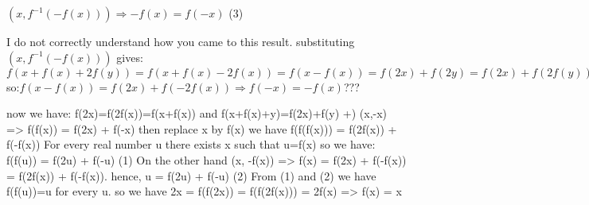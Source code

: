 \begin{solution}
	\begin{tcolorbox}$(x , f^{-1} (-f(x))) \Rightarrow -f(x)=f(-x)$ (3)\end{tcolorbox}

I do not correctly understand how you came to this result.
substituting $(x , f^{-1}(-f(x)))$ gives:
$f(x+f(x)+2f(y))=f(x+f(x)-2f(x))=f(x-f(x))=f(2x)+f(2y)=f(2x)+f(2f(y))=f(2x)+f(-2f(x))$ 
so:$f(x-f(x))=f(2x)+f(-2f(x))\Rightarrow f(-x)=-f(x)$???
\end{solution}






\begin{solution}
	now we have: f(2x)=f(2f(x))=f(x+f(x)) and  f(x+f(x)+y)=f(2x)+f(y) 
+) (x,-x) => f(f(x)) = f(2x) + f(-x) then replace x by f(x) we have f(f(f(x))) = f(2f(x)) + f(-f(x))
For every real number u there exists x such that u=f(x) so we have: f(f(u)) = f(2u) + f(-u) (1)
On the other hand (x, -f(x)) => f(x) = f(2x) + f(-f(x)) = f(2f(x)) + f(-f(x)). hence, u = f(2u) + f(-u) (2)
From (1) and (2) we have f(f(u))=u for every u. so we have 2x = f(f(2x)) = f(f(2f(x))) = 2f(x)
=> f(x) = x
\end{solution}



